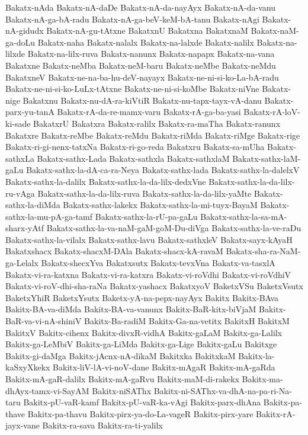 {Bakatx-nAda
Bakatx-nA-daDe
Bakatx-nA-da-nayAyx
Bakatx-nA-da-vanu
Bakatx-nA-ga-bA-radu
Bakatx-nA-ga-beV-keM-bA-tanu
Bakatx-nAgi
Bakatx-nA-gidudx
Bakatx-nA-gu-tAtxne
BakatxnU
Bakatxna
BakatxnaM
Bakatx-naM-ga-doLu
Bakatx-naha
Bakatx-nalalx
Bakatx-na-lalxde
Bakatx-nalilx
Bakatx-na-lilxde
Bakatx-na-lilx-ruva
Bakatx-nanunx
Bakatx-napapx
Bakatx-na-vana
Bakatxne
Bakatx-neMba
Bakatx-neM-baru
Bakatx-neMbe
Bakatx-neMdu
BakatxneV
Bakatx-ne-na-ba-hu-deV-nayayx
Bakatx-ne-ni-si-ko-La-bA-radu
Bakatx-ne-ni-si-ko-LuLx-tAtxne
Bakatx-ne-ni-si-koMbe
Bakatx-niVne
Bakatx-nige
Bakatxnu
Bakatx-nu-dA-ra-kiVtiR
Bakatx-nu-tapx-tayx-vA-danu
Bakatx-parx-yu-tanA
Bakatx-rA-da-re-mamx-varu
Bakatx-rA-ga-ba-yasi
Bakatx-rA-loV-ki-sade
BakatxrU
Bakatxra
Bakatx-ralilx
Bakatx-ra-maTha
Bakatx-ranunx
Bakatxre
Bakatx-reMbe
Bakatx-reMdu
Bakatx-riMda
Bakatx-riMge
Bakatx-rige
Bakatx-ri-gi-nenx-tatxNa
Bakatx-ri-go-reda
Bakatxru
Bakatx-sa-mUha
Bakatx-sathxLa
Bakatx-sathx-Lada
Bakatx-sathxla
Bakatx-sathxlaM
Bakatx-sathx-laM-gaLu
Bakatx-sathx-la-dA-ca-ra-Neya
Bakatx-sathx-lada
Bakatx-sathx-la-dalelxV
Bakatx-sathx-la-dalilx
Bakatx-sathx-la-da-lilx-dedxVne
Bakatx-sathx-la-da-lilx-ru-vAga
Bakatx-sathx-la-da-lilx-ruva
Bakatx-sathx-la-da-lilx-yaMte
Bakatx-sathx-la-diMda
Bakatx-sathx-lakekx
Bakatx-sathx-la-mi-tuyx-BayaM
Bakatx-sathx-la-mu-pA-ga-tamf
Bakatx-sathx-la-rU-pa-gaLu
Bakatx-sathx-la-sa-mA-sharx-yAtf
Bakatx-sathx-la-va-naM-gaM-goM-Du-diVga
Bakatx-sathx-la-ve-raDu
Bakatx-sathx-la-vilalx
Bakatx-sathx-lavu
Bakatx-sathxleV
Bakatx-sayx-kAyaH
Bakatxshacx
Bakatx-shacxM-DAla
Bakatx-shacx-kA-ravaM
Bakatx-sha-ra-NaM-ga-Lelalx
Bakatx-shecxYva
Bakatxsutx
Bakatx-tevxVna
Bakatx-va-tasxlA
Bakatx-vi-ra-katxna
Bakatx-vi-ra-katxra
Bakatx-vi-roVdhi
Bakatx-vi-roVdhiV
Bakatx-vi-roV-dhi-sha-raNa
Bakatx-yashacx
BakatxyoV
BaketxVSu
BaketxVsutx
BaketxYhiR
BaketxYsutx
Baketx-yA-na-pepx-nayAyx
Bakitx
Bakitx-BAva
Bakitx-BA-va-diMda
Bakitx-BA-va-vanunx
Bakitx-BaR-kitx-biVjaM
Bakitx-BaR-va-vi-nA-shiniV
Bakitx-Ba-radiM
Bakitx-Ga-na-vetitx
BakitxH
BakitxM
BakitxV
Bakitx-cihenx
Bakitx-divxR-vidhA
Bakitx-gaLaM
Bakitx-ga-Lalilx
Bakitx-ga-LeMbiV
Bakitx-ga-LiMda
Bakitx-ga-Lige
Bakitx-gaLu
Bakitxge
Bakitx-gi-daMga
Bakitx-jAcnx-nA-dikaM
Bakitxka
BakitxkaM
Bakitx-la-kaSxyXkekx
Bakitx-liV-lA-vi-noV-dane
Bakitx-mAgaR
Bakitx-mA-gaRda
Bakitx-mA-gaR-dalilx
Bakitx-mA-gaRvu
Bakitx-maM-di-rakekx
Bakitx-ma-dhAyx-tamx-vi-SayAM
Bakitx-niSAThx
Bakitx-ni-SAThx-va-dhA-na-pa-ri-Na-taru
Bakitx-pU-vaR-kamf
Bakitx-pU-vaR-ka-vAgi
Bakitx-parx-dhAna
Bakitx-pa-thave
Bakitx-pa-thavu
Bakitx-pirx-ya-do-La-vageR
Bakitx-pirx-yare
Bakitx-rA-jayx-vane
Bakitx-ra-sava
Bakitx-ra-ti-yalilx
}
